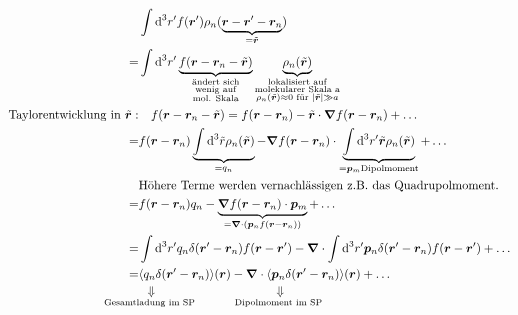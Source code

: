 \begin{align*}
&\int \dd^3 r' f(\vec{r}') \rho_n (\ub{\vec{r} - \vec{r}' - \vec{r}_n}_{= \tilde{\vec{r}}})\\
=& \int \dd ^3 r' \ub{f(\vec{r} - \vec{r}_n - \tilde{\vec{r}})}_{\substack{\tx{ändert sich} \\ \tx{wenig auf} \\ \tx{mol. Skala}}} \ub{\rho_n(\tilde{\vec{r}})}_{\substack{\tx{lokalisiert auf} \\ \tx{molekularer Skala a} \\ \rho_n(\tilde{\vec{r}})\approx 0 \tx{ für } |\tilde{\vec{r}}| \gg a }}\\
\tx{Taylorentwicklung in } \tilde{\vec{r}}: &\quad f(\vec{r} - \vec{r}_n - \tilde{\vec{r}}) = f(\vec{r} - \vec{r}_n) - \tilde{\vec{r}} \cdot \vabla f(\vec{r} - \vec{r}_n) + \dots \\
=& f(\vec{r} - \vec{r}_n) \ub{\int \dd^3 \tilde{r} \rho_n(\tilde{\vec{r}})}_{= q_n} - \vabla f(\vec{r} - \vec{r}_n) \cdot \ub{\int \dd ^3 r' \tilde{\vec{r}} \rho_n(\tilde{\vec{r}})}_{= \vec{p}_m \tx{Dipolmoment}} + \dots \\
& \tx{Höhere Terme werden vernachlässigen z.B. das Quadrupolmoment.} \\
=& f(\vec{r} - \vec{r}_n) q_n - \ub{\vabla f(\vec{r} - \vec{r}_n) \cdot \vec{p}_m}_{= \vabla \cdot (\vec{p}_n f(\vec{r} - \vec{r}_n))} + \dots \\
=& \int \dd^3r' q_n \delta(\vec{r}' - \vec{r}_n) f(\vec{r} - \vec{r}') - \vabla \cdot \int \dd^3r' \vec{p}_n \delta(\vec{r}' - \vec{r}_n) f(\vec{r} - \vec{r}') + \dots \\
=& \langle \custo{\Rightarrow}{q_n}{\mathclap{\tx{Gesamtladung im SP}}} \delta(\vec{r}' - \vec{r}_n) \rangle (\vec{r}) - \vabla \cdot \langle \custo{\Rightarrow}{\vec{p}_n}{\mathclap{\tx{Dipolmoment im SP}}} \delta(\vec{r}' - \vec{r}_n) \rangle (\vec{r}) + \dots
\end{align*}




